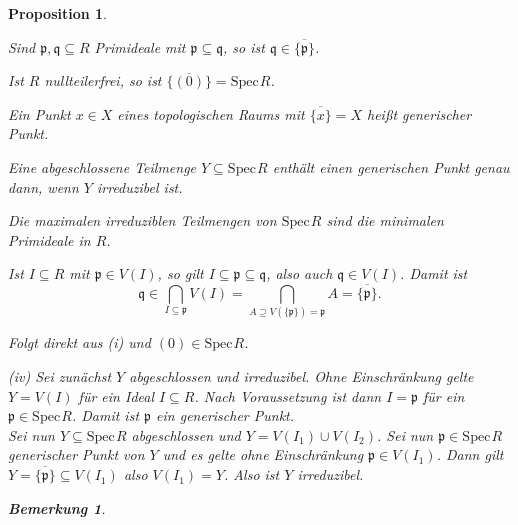 \documentclass[11pt]{book}
\newtheorem{proposition}[theorem]{Proposition}
\newtheorem{remark}[theorem]{Bemerkung}
\theoremstyle{nonumberbreak}
\newenvironment{pr}[1][]{\ifthenelse{\equal{#1}{}}{\proof}{\proof[#1]}\rm}{\endproof}
\newenvironment{bemdefin}[1][]{\ifthenelse{\equal{#1}{}}{\bemdefini}{\bemdefini[#1]}\rm}{\endbemdefini}
\newcommand{\spec}{\mathrm{Spec} \hspace{1pt} }
\newcommand{\p}{\mathfrak{p}}
\newcommand{\q}{\mathfrak{q}}
\newcommand{\ideal}{\subseteq}
\begin{document}
\begin{spacing}{1.4}
\begin{proposition}
\begin{bemdefin}   %
\begin{compactenum}
\item Sind $\p, \q \ideal R$ Primideale mit $\p \subseteq \q$, so ist $\q \in \overline{ \{\p\} }$.
\item Ist $R$ nullteilerfrei, so ist $\overline{\{ ( 0 ) \}} = \spec R$.
\item Ein Punkt $x \in X$ eines topologischen Raums mit $\overline{\{ x \}} = X$ heißt \textit{generischer Punkt}.
\item Eine abgeschlossene Teilmenge $Y\subseteq \spec R$ enthält einen generischen Punkt genau dann, wenn $Y$ irreduzibel ist.
\item Die maximalen irreduziblen Teilmengen von $\spec R$ sind die minimalen Primideale in $R$.
\end{compactenum}
\begin{pr}
\begin{compactenum}
\item Ist $I \ideal R$ mit $\p \in V(I)$, so gilt $I \subseteq \p \subseteq \q$, also auch $\q \in V(I)$. Damit ist 
$$\q \in \bigcap_{I \subseteq \p} V(I) = \bigcap_{A \supseteq V(\{\p\})=\p} A =\overline{ \{ \p \} }.$$
\item Folgt direkt aus (i) und $( 0 ) \in \spec R$.
\item[(iv)] Sei zunächst $Y$ abgeschlossen und irreduzibel. Ohne Einschränkung gelte $Y=V(I)$ für ein Ideal $I \ideal R$. Nach Voraussetzung ist dann $I= \p$ für ein $\p \in \spec R$. Damit ist $\p$ ein generischer Punkt.\\
Sei nun $Y\subseteq \spec R$ abgeschlossen und $Y=V(I_1) \cup V(I_2)$. 
Sei nun $\p\in\spec R$ generischer Punkt von $Y$ und es gelte ohne Einschränkung $\p \in V(I_1)$. 
Dann gilt $Y=\overline{ \{ \p \} }\subseteq V(I_1)$ also $V(I_1) = Y$.
Also ist $Y$ irreduzibel.

\end{compactenum}
\end{pr}

\end{bemdefin}




\begin{remark}   %


\end{remark}
\end{proposition}
\end{spacing}
\end{document}
